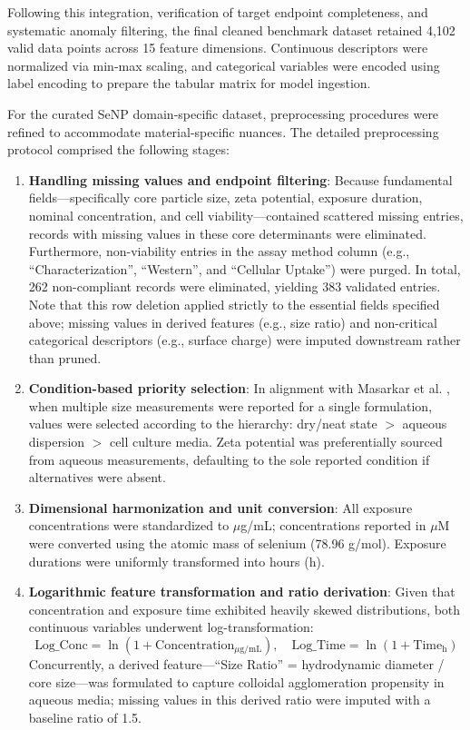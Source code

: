 Following this integration, verification of target endpoint completeness, and systematic anomaly filtering, the final cleaned benchmark dataset retained 4,102 valid data points across 15 feature dimensions. Continuous descriptors were normalized via min-max scaling, and categorical variables were encoded using label encoding to prepare the tabular matrix for model ingestion.

For the curated SeNP domain-specific dataset, preprocessing procedures were refined to accommodate material-specific nuances. The detailed preprocessing protocol comprised the following stages:

\begin{enumerate}
  \item \textbf{Handling missing values and endpoint filtering}: Because fundamental fields—specifically core particle size, zeta potential, exposure duration, nominal concentration, and cell viability—contained scattered missing entries, records with missing values in these core determinants were eliminated. Furthermore, non-viability entries in the assay method column (e.g., ``Characterization'', ``Western'', and ``Cellular Uptake'') were purged. In total, 262 non-compliant records were eliminated, yielding 383 validated entries. Note that this row deletion applied strictly to the essential fields specified above; missing values in derived features (e.g., size ratio) and non-critical categorical descriptors (e.g., surface charge) were imputed downstream rather than pruned.

  \item \textbf{Condition-based priority selection}: In alignment with Masarkar et al. \cite{masarkar2024}, when multiple size measurements were reported for a single formulation, values were selected according to the hierarchy: dry/neat state $>$ aqueous dispersion $>$ cell culture media. Zeta potential was preferentially sourced from aqueous measurements, defaulting to the sole reported condition if alternatives were absent.

  \item \textbf{Dimensional harmonization and unit conversion}: All exposure concentrations were standardized to $\mu$g/mL; concentrations reported in $\mu$M were converted using the atomic mass of selenium (78.96 g/mol). Exposure durations were uniformly transformed into hours (h).

  \item \textbf{Logarithmic feature transformation and ratio derivation}: Given that concentration and exposure time exhibited heavily skewed distributions, both continuous variables underwent log-transformation:
        \[
          \text{Log\_Conc} = \ln(1 + \text{Concentration}_{\mu\text{g/mL}}), \quad
          \text{Log\_Time} = \ln(1 + \text{Time}_{\text{h}})
        \]
        Concurrently, a derived feature—``Size Ratio'' = hydrodynamic diameter / core size—was formulated to capture colloidal agglomeration propensity in aqueous media; missing values in this derived ratio were imputed with a baseline ratio of 1.5.


\end{enumerate}
